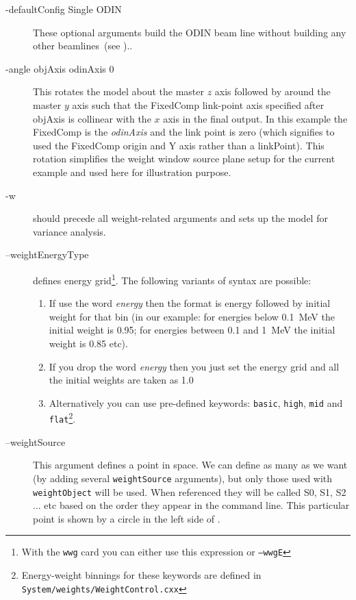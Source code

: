   \begin{description}
\item[-defaultConfig Single ODIN ] These optional arguments build the ODIN beam line
  without building any other beamlines~(see )..

\item[-angle objAxis odinAxis 0] This rotates the model about the 
  master $z$ axis followed by around the master $y$ axis such that
  the FixedComp link-point axis specified after objAxis is collinear with the
  $x$ axis in the final output. In this example the FixedComp is the {\it odinAxis}
  and the link point is zero (which signifies to used the FixedComp origin and Y axis
  rather than a linkPoint).
  This rotation simplifies the weight window source plane setup
  for the current example and used here for illustration purpose.

\item[-w] should precede all weight-related arguments and sets up the model for variance analysis.
  
\item[--weightEnergyType] defines energy grid\footnote{With the {\tt wwg} card you can either use this expression or
  {\tt --wwgE}}.
  The following variants of syntax are possible:
  \begin{enumerate}

    \item If use the word {\em energy} then the format is energy followed by initial weight for that bin
      (in our example: for energies below \SI{0.1}{\mega\electronvolt} the initial weight is \num{0.95};
          for energies between \num{0.1} and \SI{1}{\mega\electronvolt} the initial weight is \num{0.85} etc).
        \item If you drop the word {\em energy} then you just set the energy grid and all the initial weights are
          taken as 1.0
    \item Alternatively you can use pre-defined keywords:
      {\tt basic}, {\tt high}, {\tt mid} and {\tt flat}\footnote{Energy-weight binnings for these keywords are defined in \tt{System/weights/WeightControl.cxx}}.
  \end{enumerate}
  
\item[--weightSource] This argument defines a point in space.
  We can define as many as we want (by adding several {\tt weightSource} arguments),
  but only those used with {\tt weightObject} will be used. When referenced they will be called S0, S1, S2 ... etc
  based on the order they appear in the command line.
  This particular point is shown by a circle in the left side of .
  

\end{description}
